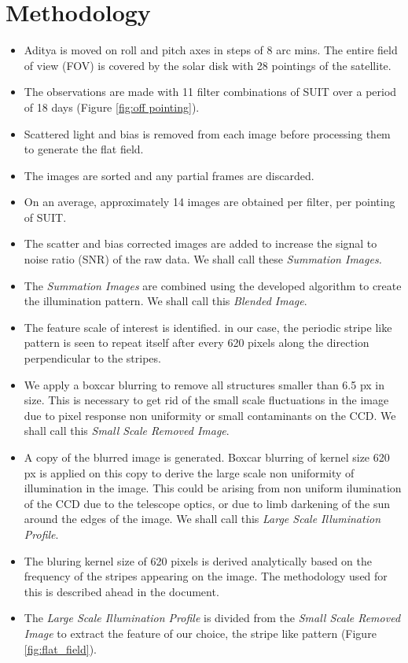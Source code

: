 \documentclass[11pt,a4paper]{article}
\begin{document}
	\section{Methodology}
	\begin{itemize}
		\item Aditya is moved on roll and pitch axes in steps of 8 arc mins. The entire field of view (FOV) is covered by the solar disk with 28 pointings of the satellite.
		\item The observations are made with 11 filter combinations of SUIT over a period of 18 days (Figure \ref{fig:off pointing}).
		\item Scattered light and bias is removed from each image before processing them to generate the flat field.
		\item The images are sorted and any partial frames are discarded.
		\item On an average, approximately 14 images are obtained per filter, per pointing of SUIT.
		\item The scatter and bias corrected images are added to increase the signal to noise ratio (SNR) of the raw data. We shall call these \textit{Summation Images.}
		\item The \textit{Summation Images} are combined using the developed algorithm to create the illumination pattern. We shall call this \textit{Blended Image}.
		\item The feature scale of interest is identified. in our case, the periodic stripe like pattern is seen to repeat itself after every 620 pixels along the direction perpendicular to the stripes.
		\item We apply a boxcar blurring to remove all structures smaller than 6.5 px in size. This is necessary to get rid of the small scale fluctuations in the image due to pixel response non uniformity or small contaminants on the CCD. We shall call this \textit{Small Scale Removed Image}.
		\item A copy of the blurred image is generated. Boxcar blurring of kernel size 620 px is applied on this copy to derive the large scale non uniformity of illumination in the image. This could be arising from non uniform ilumination of the CCD due to the telescope optics, or due to limb darkening of the sun around the edges of the image. We shall call this \textit{Large Scale Illumination Profile}.
		\item The bluring kernel size of 620 pixels is derived analytically based on the frequency of the stripes appearing on the image. The methodology used for this is described ahead in the document.
		\item The \textit{Large Scale Illumination Profile} is divided from the \textit{Small Scale Removed Image} to extract the feature of our choice, the stripe like pattern (Figure \ref{fig:flat_field}).
	\end{itemize}
	
\end{document}
